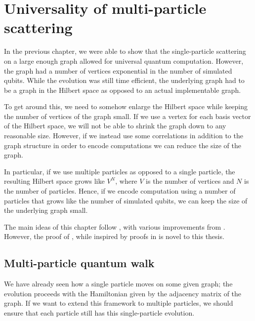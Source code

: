 \documentclass[../thesis-main/thesis-main]{subfiles}
\begin{document}
\chapter{Universality of multi-particle scattering}
\label{chap:MP_universality}



In the previous chapter, we were able to show that the single-particle scattering on a large enough graph allowed for universal quantum computation.  However, the graph had a number of vertices exponential in the number of simulated qubits.  While the evolution was still time efficient, the underlying graph had to be a graph in the Hilbert space as opposed to an actual implementable graph.

To get around this, we need to somehow enlarge the Hilbert space while keeping the number of vertices of the graph small.  If we use a vertex for each basis vector of the Hilbert space, we will not be able to shrink the graph down to any reasonable size.  However, if we instead use some correlations in addition to the graph structure in order to encode computations we can reduce the size of the graph.

In particular, if we use multiple particles as opposed to a single particle, the resulting Hilbert space grows like $V^N$, where $V$ is the number of vertices and $N$ is the number of particles.  Hence, if we encode computation using a number of particles that grows like the number of simulated qubits, we can keep the size of the underlying graph small.

The main ideas of this chapter follow \cite{MPQW}, with various improvements from \cite{MomSwitches}.  However, the proof of , while inspired by proofs in \cite{MPQW} is novel to this thesis.


\section{Multi-particle quantum walk}

We have already seen how a single particle moves on some given graph; the evolution proceeds with the Hamiltonian given by the adjacency matrix of the graph.  If we want to extend this framework to multiple particles, we should ensure that each particle still has this single-particle evolution.
\end{document}
